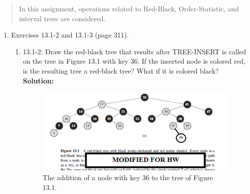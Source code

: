 \documentclass[11pts]{article}
\begin{document}
\maketitle

\begin{abstract}
In this assignment, operations related to Red-Black, Order-Statistic, and
interval trees are considered.
\end{abstract}
\newpage

\begin{enumerate}
\item Exercises 13.1-2 and 13.1-3 (page 311).

  \begin{enumerate}
  \item  13.1-2: Draw the red-black tree that results after
         TREE-INSERT is called
         on the tree in Figure 13.1 with key 36. If the inserted node is
         colored red, is the resulting tree a red-black tree? What if it
         is colored black? \\

  \textbf{Solution:} 
  \begin{figure}[h!]
    \centering
      \includegraphics[width=1.0\textwidth]{Fig13_1_c.PNG}
    \caption{The addition of a node with key 36 to the tree of Figure 13.1.}
  \end{figure}


\end{enumerate}
\end{enumerate}
\end{document}
